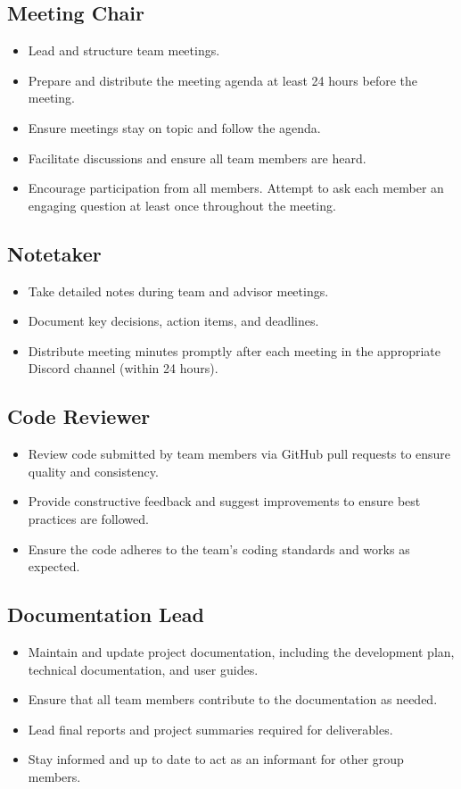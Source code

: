 \documentclass{article}
\begin{document}
\subsection{Meeting Chair} 
  \begin{itemize}
    \item Lead and structure team meetings.
    \item Prepare and distribute the meeting agenda at least 24 hours before the meeting.
    \item Ensure meetings stay on topic and follow the agenda.
    \item Facilitate discussions and ensure all team members are heard.
    \item Encourage participation from all members. Attempt to ask each member an engaging question at least once throughout the meeting.
  \end{itemize}

\subsection{Notetaker}
  \begin{itemize}
    \item Take detailed notes during team and advisor meetings.
    \item Document key decisions, action items, and deadlines.
    \item Distribute meeting minutes promptly after each meeting in the appropriate Discord channel (within 24 hours).
  \end{itemize}

  \subsection{Code Reviewer}
  \begin{itemize}
    \item Review code submitted by team members via GitHub pull requests to ensure quality and consistency.
    \item Provide constructive feedback and suggest improvements to ensure best practices are followed.
    \item Ensure the code adheres to the team's coding standards and works as expected.
  \end{itemize}

\subsection{Documentation Lead}
  \begin{itemize}
    \item Maintain and update project documentation, including the development plan, technical documentation, and user guides.
    \item Ensure that all team members contribute to the documentation as needed.
    \item Lead final reports and project summaries required for deliverables.
    \item Stay informed and up to date to act as an informant for other group members.
  \end{itemize}
  
\end{document}
